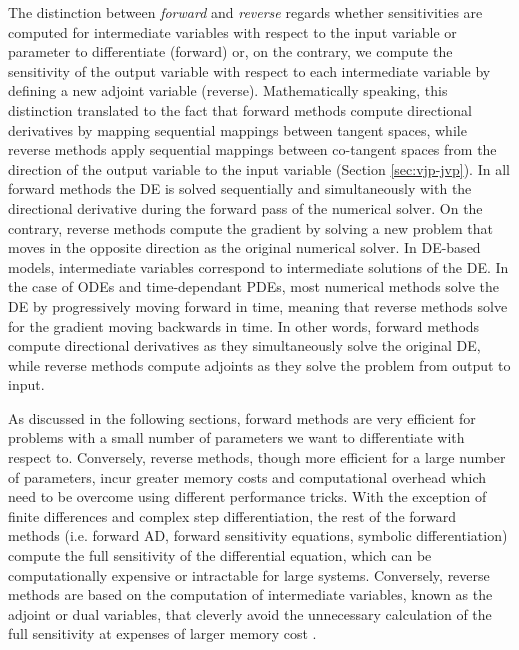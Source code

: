 The distinction between \textit{forward} and \textit{reverse} regards whether sensitivities are computed for intermediate variables with respect to the input variable or parameter to differentiate (forward) or, on the contrary, we compute the sensitivity of the output variable with respect to each intermediate variable by defining a new adjoint variable (reverse). 
Mathematically speaking, this distinction translated to the fact that forward methods compute directional derivatives by mapping sequential mappings between tangent spaces, while reverse methods apply sequential mappings between co-tangent spaces from the direction of the output variable to the input variable (Section \ref{sec:vjp-jvp}).   
In all forward methods the DE is solved sequentially and simultaneously with the directional derivative during the forward pass of the numerical solver. 
On the contrary, reverse methods compute the gradient by solving a new problem that moves in the opposite direction as the original numerical solver.
In DE-based models, intermediate variables correspond to intermediate solutions of the DE.
In the case of ODEs and time-dependant PDEs, most numerical methods solve the DE by progressively moving forward in time, meaning that reverse methods solve for the gradient moving backwards in time. 
In other words, forward methods compute directional derivatives as they simultaneously solve the original DE, while reverse methods compute adjoints as they solve the problem from output to input.

As discussed in the following sections, forward methods are very efficient for problems with a small number of parameters we want to differentiate with respect to. 
Conversely, reverse methods, though more efficient for a large number of parameters, incur greater memory costs and computational overhead which need to be overcome using different performance tricks. 
With the exception of finite differences and complex step differentiation, the rest of the forward methods (i.e. forward AD, forward sensitivity equations, symbolic differentiation) compute the full sensitivity of the differential equation, which can be computationally expensive or intractable for large systems. 
Conversely, reverse methods are based on the computation of intermediate variables, known as the adjoint or dual variables, that cleverly avoid the unnecessary calculation of the full sensitivity at expenses of larger memory cost \cite{Givoli_2021}. 

